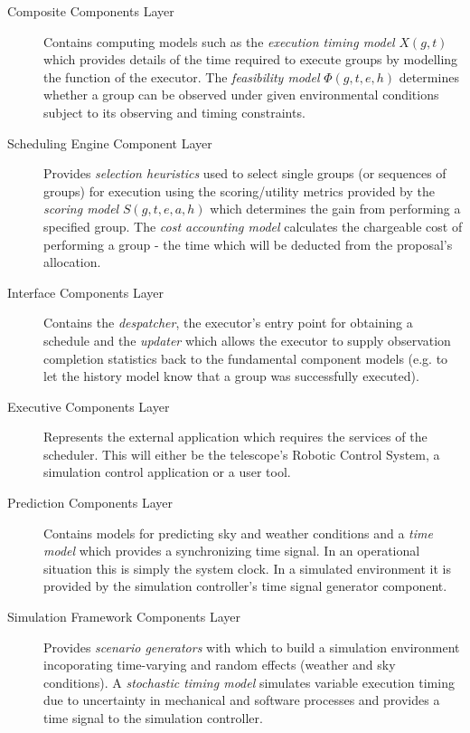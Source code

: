 \documentclass[12pt,a4paper]{article}
\begin{document}
{\begin{description}
\item[Composite Components Layer] Contains computing models such as the \emph{execution timing model} $X(g,t)$ which provides details of the time required to execute groups by modelling the function of the executor. The \emph{feasibility model} $\Phi(g,t,e,h)$ determines whether a group can be observed under given environmental conditions subject to its observing and timing constraints.

\item[Scheduling Engine Component Layer] Provides \emph{selection heuristics} used to select single groups (or sequences of groups) for execution using the scoring/utility metrics provided by the \emph{scoring model} $S(g,t,e,a,h)$ which determines the gain from performing a specified group. The \emph{cost accounting model} calculates the chargeable cost of performing a group - the time which will be deducted from the proposal's allocation.

\item[Interface Components Layer] Contains the \emph{despatcher}, the executor's entry point for obtaining a schedule and the \emph{updater} which allows the executor to supply observation completion statistics back to the fundamental component models (e.g. to let the history model know that a group was successfully executed).

\item[Executive Components Layer] Represents the external application which requires the services of the scheduler. This will either be the telescope's Robotic Control System, a simulation control application or a user tool.

\item[Prediction Components Layer] Contains models for predicting sky and weather conditions and a \emph{time model} which provides a synchronizing time signal. In an operational situation this is simply the system clock. In a simulated environment it is provided by the simulation controller's time signal generator component.

\item[Simulation Framework Components Layer] Provides \emph{scenario generators} with which to build a simulation environment incoporating time-varying and random effects (weather and sky conditions). A \emph{stochastic timing model} simulates variable execution timing due to uncertainty in mechanical and software processes and provides a time signal to the simulation controller.
\end{description}

}
\end{document}
